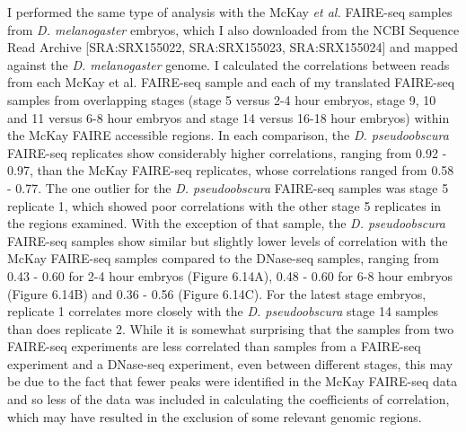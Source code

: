 I performed the same type of analysis with the McKay \emph{et al.} FAIRE-seq samples from \emph{D. melanogaster} embryos, which I also downloaded from the NCBI Sequence Read Archive [SRA:SRX155022, SRA:SRX155023, SRA:SRX155024] and mapped against the \emph{D. melanogaster} genome. I calculated the correlations between reads from each McKay et al. FAIRE-seq sample and each of my translated FAIRE-seq samples from overlapping stages (stage 5 versus 2-4 hour embryos, stage 9, 10 and 11 versus 6-8 hour embryos and stage 14 versus 16-18 hour embryos) within the McKay FAIRE accessible regions. In each comparison, the \emph{D. pseudoobscura} FAIRE-seq replicates show considerably higher correlations, ranging from 0.92 - 0.97, than the McKay FAIRE-seq replicates, whose correlations ranged from 0.58 - 0.77. The one outlier for the \emph{D. pseudoobscura} FAIRE-seq samples was stage 5 replicate 1, which showed poor correlations with the other stage 5 replicates in the regions examined. With the exception of that sample, the \emph{D. pseudoobscura} FAIRE-seq samples show similar but slightly lower levels of correlation with the McKay FAIRE-seq samples compared to the DNase-seq samples, ranging from 0.43 - 0.60 for 2-4 hour embryos (Figure 6.14A), 0.48 - 0.60 for 6-8 hour embryos (Figure 6.14B) and 0.36 - 0.56 (Figure 6.14C). For the latest stage embryos, replicate 1 correlates more closely with the \emph{D. pseudoobscura} stage 14 samples than does replicate 2. While it is somewhat surprising that the samples from two FAIRE-seq experiments are less correlated than samples from a FAIRE-seq experiment and a DNase-seq experiment, even between different stages, this may be due to the fact that fewer peaks were identified in the McKay FAIRE-seq data and so less of the data was included in calculating the coefficients of correlation, which may have resulted in the exclusion of some relevant genomic regions.

